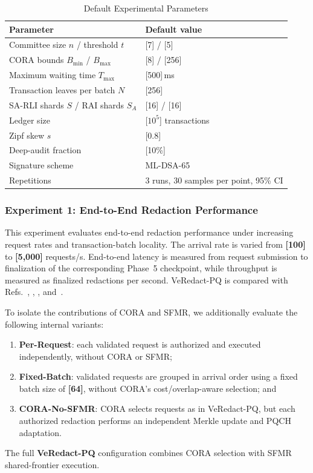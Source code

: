 \documentclass[lettersize,journal]{IEEEtran}
\begin{document}
\begin{table}[t]
\centering
\caption{Default Experimental Parameters}
\label{tab:params}
\scriptsize
\renewcommand{\arraystretch}{1.08}
\setlength{\tabcolsep}{4pt}
\begin{tabular}{ll}
\hline
\textbf{Parameter} & \textbf{Default value} \\
\hline
Committee size $n$ / threshold $t$ & [7] / [5] \\
CORA bounds $B_{\min}$ / $B_{\max}$ & [8] / [256] \\
Maximum waiting time $T_{\max}$ & [500]\,ms \\
Transaction leaves per batch $N$ & [256] \\
SA-RLI shards $S$ / RAI shards $S_A$ & [16] / [16] \\
Ledger size & [$10^5$] transactions \\
Zipf skew $s$ & [0.8] \\
Deep-audit fraction & [10\%] \\
Signature scheme & ML-DSA-65 \\
Repetitions & 3 runs, 30 samples per point, 95\% CI \\
\hline
\end{tabular}
\end{table}

    
\subsubsection*{\textbf{Experiment 1: End-to-End Redaction Performance}}

This experiment evaluates end-to-end redaction performance under
increasing request rates and transaction-batch locality. The arrival
rate is varied from \textbf{[100]} to \textbf{[5,000]} requests/s.
End-to-end latency is measured from request submission to finalization
of the corresponding Phase~5 checkpoint, while throughput is measured
as finalized redactions per second. VeRedact-PQ is compared with
Refs.~\cite{ref1}, \cite{ref13}, \cite{ref27}, and~\cite{ref34}.

To isolate the contributions of CORA and SFMR, we additionally evaluate
the following internal variants:
\begin{enumerate}
\item \textbf{Per-Request}: each validated request is authorized and
executed independently, without CORA or SFMR;
\item \textbf{Fixed-Batch}: validated requests are grouped in arrival
order using a fixed batch size of \textbf{[64]}, without CORA's
cost/overlap-aware selection; and
\item \textbf{CORA-No-SFMR}: CORA selects requests as in VeRedact-PQ,
but each authorized redaction performs an independent Merkle update
and PQCH adaptation.
\end{enumerate}
The full \textbf{VeRedact-PQ} configuration combines CORA selection
with SFMR shared-frontier execution.
\end{document}

